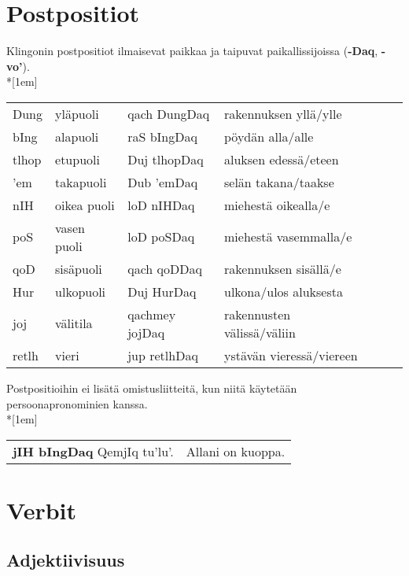 \documentclass{book}
\begin{document}
\chapter{Postpositiot}

Klingonin postpositiot ilmaisevat paikkaa ja taipuvat paikallissijoissa (\textbf{-Daq}, \textbf{-vo'}).
\\*[1em]
\begin{tabular}{Bl Il | Bl l}
    Dung & yläpuoli & qach DungDaq & rakennuksen yllä/ylle \\
    bIng & alapuoli & raS bIngDaq & pöydän alla/alle \\
    tlhop & etupuoli & Duj tlhopDaq & aluksen edessä/eteen \\
    'em & takapuoli & Dub 'emDaq & selän takana/taakse \\
    nIH & oikea puoli & loD nIHDaq & miehestä oikealla/e \\
    poS & vasen puoli & loD poSDaq & miehestä vasemmalla/e \\
    qoD & sisäpuoli & qach qoDDaq & rakennuksen sisällä/e \\
    Hur & ulkopuoli & Duj HurDaq & ulkona/ulos aluksesta \\
    joj & välitila & qachmey jojDaq & rakennusten välissä/väliin \\
    retlh & vieri & jup retlhDaq & ystävän vieressä/viereen \\
\end{tabular}

Postpositioihin ei lisätä omistusliitteitä, kun niitä käytetään persoonapronominien kanssa.\\*[1em]
\begin{tabular}{l l}
    \textbf{jIH bIngDaq} QemjIq tu'lu'. & Allani on kuoppa.
\end{tabular}

\chapter{Verbit}

\section{Adjektiivisuus}
\end{document}
